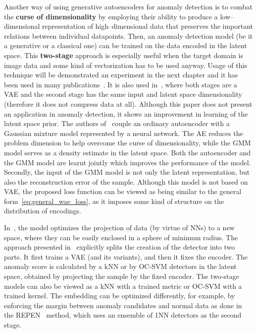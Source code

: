 Another way of using generative autoencoders for anomaly detection is to combat the \textbf{curse of dimensionality} by employing their ability to produce a low--dimensional representation of high--dimensional data that preserves the important relations between individual datapoints. Then, an anomaly detection model (be it a generative or a classical one) can be trained on the data encoded in the latent space. This \textbf{two-stage} approach is especially useful when the target domain is image data and some kind of vectorization has to be used anyway. Usage of this technique will be demonstrated an experiment in the next chapter and it has been used in many publications~\cite{ergen2017unsupervised, yaoUnsupervisedAnomalyDetection2019, ruff2018deep, vskvara2020detection}. It is also used in~\cite{dai2019diagnosing}, where both stages are a VAE and the second stage has the same input and latent space dimensionality (therefore it does not compress data at all). Although this paper does not present an application in anomaly detection, it shows an improvement in learning of the latent space prior. The authors of~\cite{zong2018deep} couple an ordinary autoencoder with a Gaussian mixture model represented by a neural network. The AE reduces the problem dimension to help overcome the curse of dimensionality, while the GMM model serves as a density estimate in the latent space. Both the autoencoder and the GMM model are learnt jointly which improves the performance of the model. Secondly, the input of the GMM model is not only the latent representation, but also the reconstruction error of the sample. Although this model is not based on VAE, the proposed loss function can be viewed as being similar to the general form~\eqref{eq:general_wae_loss}, as it imposes some kind of structure on the distribution of encodings. 

In~\cite{ruff2018deep}, the model optimizes the projection of data (by virtue of NNs) to a new space, where they can be easily enclosed in a sphere of minimum radius. The approach presented in~\cite{vskvara2020detection, yaoUnsupervisedAnomalyDetection2019} explicitly splits the creation of the detector into two parts. It first trains a VAE (and its variants), and then it fixes the encoder. The anomaly score is calculated by a kNN \cite{vskvara2020detection} or by OC-SVM \cite{yaoUnsupervisedAnomalyDetection2019} detectors in the latent space, obtained by projecting the sample by the fixed encoder. The two-stage models can also be viewed as a kNN with a trained metric or OC-SVM with a trained kernel. The embedding can be optimized differently, for example, by enforcing the margin between anomaly candidates and normal data as done in the REPEN~\cite{pangLearningRepresentationsUltrahighdimensional2018} method, which uses an ensemble of 1NN detectors as the second stage.


